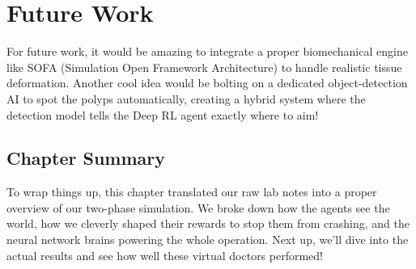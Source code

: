 \section{Future Work}

For future work, it would be amazing to integrate a proper biomechanical engine like SOFA (Simulation Open Framework Architecture) to handle realistic tissue deformation. Another cool idea would be bolting on a dedicated object-detection AI to spot the polyps automatically, creating a hybrid system where the detection model tells the Deep RL agent exactly where to aim!

\subsection{Chapter Summary}
To wrap things up, this chapter translated our raw lab notes into a proper overview of our two-phase simulation. We broke down how the agents see the world, how we cleverly shaped their rewards to stop them from crashing, and the neural network brains powering the whole operation. Next up, we'll dive into the actual results and see how well these virtual doctors performed!

\vfill
